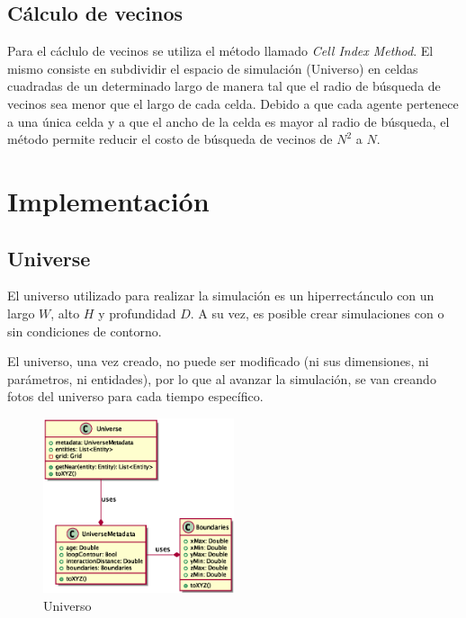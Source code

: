\documentclass[a4paper]{article}
\begin{document}
        \subsection{Cálculo de vecinos}
            Para el cáclulo de vecinos se utiliza el método llamado \textit{Cell Index Method}. El mismo consiste en subdividir el espacio de simulación (Universo) en celdas cuadradas de un determinado largo de manera tal que el radio de búsqueda de vecinos sea menor que el largo de cada celda. Debido a que cada agente pertenece a una única celda y a que el ancho de la celda es mayor al radio de búsqueda, el método permite reducir el costo de búsqueda de vecinos de $N^2$ a $N$.


    \section{Implementación}

        \subsection{Universe}

            El universo utilizado para realizar la simulación es un hiperrectánculo con un largo $W$, alto $H$ y profundidad $D$. A su vez, es posible crear simulaciones con o sin condiciones de contorno.

            El universo, una vez creado, no puede ser modificado (ni sus dimensiones, ni parámetros, ni entidades), por lo que al avanzar la simulación, se van creando fotos del universo para cada tiempo específico.


            \begin{figure}[H]
                \centering
                \includegraphics[width=0.5\textwidth]{../imgs/universe}
                \caption{Universo}
                \label{fig:universe_implementation}
            \end{figure}
\end{document}
